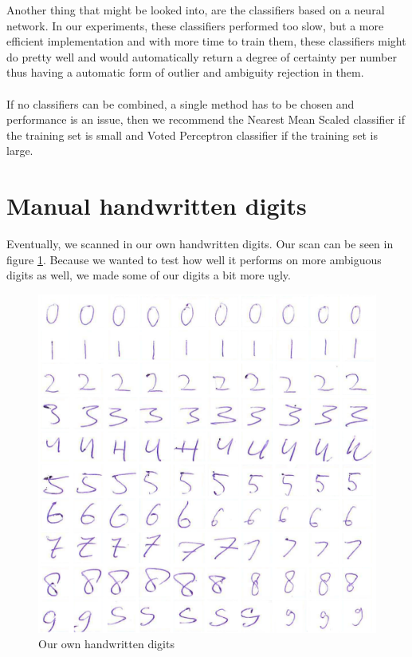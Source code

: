 \documentclass[%
        compressed,
        final,
        notitlepage,
        narroweqnarray,
        inline,
        twoside,
        ]{ieee}
\begin{document}
Another thing that might be looked into, are the classifiers based on a neural
network. In our experiments, these classifiers performed too slow, but a more
efficient implementation and with more time to train them, these classifiers
might do pretty well and would automatically return a degree of certainty per number thus having a automatic form of outlier and ambiguity rejection in them.\\\\
If no classifiers can be combined, a single method has to be chosen and
performance is an issue, then we recommend the Nearest Mean Scaled classifier if
the training set is small and Voted Perceptron classifier if the training set is
large.

\pagebreak
\appendix

\section{Manual handwritten digits}
Eventually, we scanned in our own handwritten digits. Our scan can be seen in figure
\ref{fig:handwritten}. Because we wanted to test how well it performs on
more ambiguous digits as well, we made some of our digits a bit more ugly.

\begin{figure}
    \includegraphics[width=\columnwidth]{images/handwritten.png}
    \caption{Our own handwritten digits}
    \label{fig:handwritten}
\end{figure}
\end{document}
